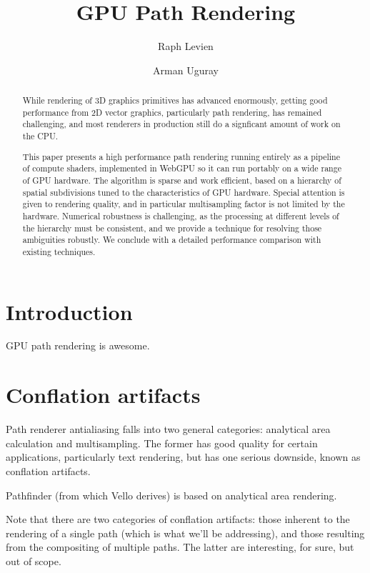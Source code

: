\documentclass[format=acmsmall]{acmart}
\begin{document}
\title{GPU Path Rendering}
\author{Raph Levien}
\author{Arman Uguray}

\begin{abstract}
    While rendering of 3D graphics primitives has advanced enormously, getting good performance from 2D vector graphics, particularly path rendering, has remained challenging, and most renderers in production still do a signficant amount of work on the CPU.

    This paper presents a high performance path rendering running entirely as a pipeline of compute shaders, implemented in WebGPU so it can run portably on a wide range of GPU hardware. The algorithm is sparse and work efficient, based on a hierarchy of spatial subdivisions tuned to the characteristics of GPU hardware. Special attention is given to rendering quality, and in particular multisampling factor is not limited by the hardware. Numerical robustness is challenging, as the processing at different levels of the hierarchy must be consistent, and we provide a technique for resolving those ambiguities robustly. We conclude with a detailed performance comparison with existing techniques.
\end{abstract}

\maketitle
\thispagestyle{empty}
\pagestyle{plain}

\section{Introduction}

GPU path rendering is awesome.

\section{Conflation artifacts}

Path renderer antialiasing falls into two general categories: analytical area calculation and multisampling. The former has good quality for certain applications, particularly text rendering, but has one serious downside, known as conflation artifacts.

Pathfinder (from which Vello derives) is based on analytical area rendering.

Note that there are two categories of conflation artifacts: those inherent to the rendering of a single path (which is what we'll be addressing), and those resulting from the compositing of multiple paths. The latter are interesting, for sure, but out of scope.
\end{document}
